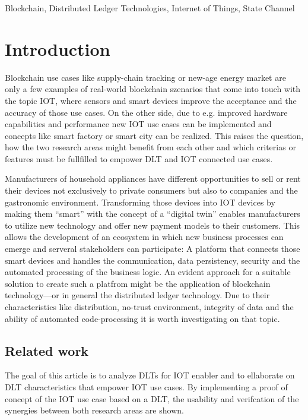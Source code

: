 \documentclass[conference]{IEEEtran}
\begin{document}
\begin{IEEEkeywords}
Blockchain, Distributed Ledger Technologies, Internet of Things, State Channel
\end{IEEEkeywords}


\section{Introduction}
Blockchain use cases like supply-chain tracking or new-age energy market are only a few examples of real-world blockchain szenarios that come into touch with the topic IOT, where sensors and smart devices improve the acceptance and the accuracy of those use cases. On the other side, due to e.g. improved hardware capabilities and performance new IOT use cases can be implemented and concepts like smart factory or smart city can be realized. This raises the question, how the two research areas might benefit from each other and which criterias or features must be fullfilled to empower DLT and IOT connected use cases.

Manufacturers of household appliances have different opportunities to sell or rent their devices not exclusively to private consumers but also to companies and the gastronomic environment. Transforming those devices into IOT devices by making them \enquote{smart} with the concept of a \enquote{digital twin} enables manufacturers to utilize new technology and offer new payment models to their customers. This allows the development of an ecosystem in which new business processes can emerge and serveral stakeholders can participate: A platform that connects those smart devices and handles the communication, data persistency, security and the automated processing of the business logic. An evident approach for a suitable solution to create such a platfrom might be the application of blockchain technology---or in general the distributed ledger technology. Due to their characteristics like distribution, no-trust environment, integrity of data and the ability of automated code-processing it is worth investigating on that topic.

\subsection{Related work}
The goal of this article is to analyze DLTs for IOT enabler and to ellaborate on DLT characteristics that empower IOT use cases. By implementing a proof of concept of the IOT use case based on a DLT, the usability and verifcation of the synergies between both research areas are shown.
\end{document}

